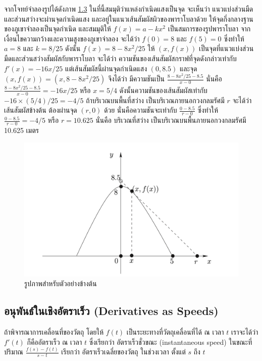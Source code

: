 \documentclass[
]{book}
\theoremstyle{definition}
\theoremstyle{definition}
\theoremstyle{definition}
\theoremstyle{definition}
\theoremstyle{remark}
\begin{document}
จากโจทย์จำลองรูปได้ดังภาพ \hyperref[fig-mountain]{1.3} ในที่นี้สมมุติว่าแหล่งกำเนิดแสงเป็นจุด จะเห็นว่า
แนวแบ่งส่วนมืดและส่วนสว่างจะผ่านจุดกำเนิดแสง และอยู่ในแนวเส้นสัมผัสผิวของพาราโบลาด้วย
ให้จุดกึ่งกลางฐานของภูเขาจำลองเป็นจุดกำเนิด และสมมุติให้ \(f(x)=a-kx^2\)
เป็นสมการของรูปพาราโบลา จากเงื่อนไขความกว้างและความสูงของภูเขาจำลอง จะได้ว่า
\(f(0)=8\) และ \(f(5)=0\) ซึ่งทำให้ \(a=8\) และ \(k=8/25\) ดังนั้น \(f(x)=8-8x^2/25\) ให้
\((x,f(x))\) เป็นจุดที่แนวแบ่งส่วนมืดและส่วนสว่างสัมผัสกับพาราโบลา จะได้ว่า
ความชันของเส้นสัมผัสกราฟที่จุดดังกล่าวเท่ากับ \(f'(x)=-16x/25\)
แต่เส้นสัมผัสนี้ผ่านจุดกำเนิดแสง \((0,8.5)\) และจุด \((x,f(x))=(x,8-8x^2/25)\) จึงได้ว่า
มีความชันเป็น \(\displaystyle\frac{8-8x^2/25-8.5}{x-0}\) นั่นคือ
\(\displaystyle\frac{8-8x^2/25-8.5}{x-0}=-16x/25\) หรือ \(x=5/4\)
ดังนั้นความชันของเส้นสัมผัสเท่ากับ \(-16\times(5/4)/25=-4/5\) ถ้าบริเวณบนพื้นที่สว่าง
เป็นบริเวณภายนอกวงกลมรัศมี \(r\) จะได้ว่า เส้นสัมผัสข้างต้น ต้องผ่านจุด \((r,0)\) ด้วย
นั่นคือความชันจะเท่ากับ \(\displaystyle\frac{0-8.5}{r-0}\) ซึ่งทำให้
\(\displaystyle\frac{0-8.5}{r-0}=-4/5\) หรือ \(r=10.625\) นั่นคือ บริเวณที่สว่าง
เป็นบริเวณบนพื้นภายนอกวงกลมรัศมี 10.625 เมตร

\begin{figure}

{\centering \includegraphics[width=0.5\linewidth]{images/fig-derivative-3} 

}

\caption{รูปภาพสำหรับตัวอย่างข้างต้น}\label{fig:fig-derivative-3}
\end{figure}

\subsection{อนุพันธ์ในเชิงอัตราเร็ว (Derivatives as Speeds)}\label{uxe2duxe19uxe1euxe19uxe18uxe43uxe19uxe40uxe0auxe07uxe2duxe15uxe23uxe32uxe40uxe23uxe27-derivatives-as-speeds}

ถ้าพิจารณาการเคลื่อนที่ของวัตถุ โดยให้ \(f(t)\) เป็นระยะทางที่วัตถุเคลื่อนที่ได้ ณ เวลา \(t\)
เราจะได้ว่า \(f'(t)\) ก็คืออัตราเร็ว ณ เวลา \(t\) ซึ่งเรียกว่า อัตราเร็วชั่วขณะ
(instantaneous speed) ในขณะที่ปริมาณ \(\displaystyle \frac{f(s)-f(t)}{s-t}\)
เรียกว่า อัตราเร็วเฉลี่ยของวัตถุ ในช่วงเวลา ตั้งแต่ \(s\) ถึง \(t\)
\end{document}
